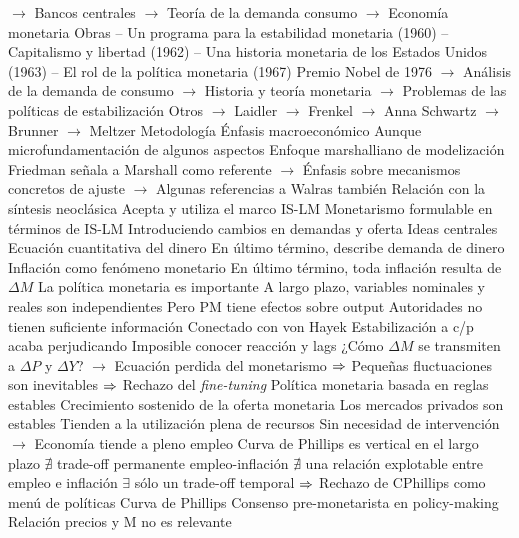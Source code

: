 \documentclass{nuevotema}
\begin{document}
\begin{esquemal}
				\4[] $\to$ Bancos centrales
				\4[] $\to$ Teoría de la demanda consumo
				\4[] $\to$ Economía monetaria
				\4[] Obras
				\4[] -- Un programa para la estabilidad monetaria (1960)
				\4[] -- Capitalismo y libertad (1962)
				\4[] -- Una historia monetaria de los Estados Unidos (1963)
				\4[] -- El rol de la política monetaria (1967)
				\4[] Premio Nobel de 1976
				\4[] $\to$ Análisis de la demanda de consumo
				\4[] $\to$ Historia y teoría monetaria
				\4[] $\to$ Problemas de las políticas de estabilización
				\4[] Otros
				\4[] $\to$ Laidler
				\4[] $\to$ Frenkel
				\4[] $\to$ Anna Schwartz
				\4[] $\to$ Brunner
				\4[] $\to$ Meltzer
			\3 Metodología
				\4 Énfasis macroeconómico
				\4[] Aunque microfundamentación de algunos aspectos
				\4 Enfoque marshalliano de modelización
				\4[] Friedman señala a Marshall como referente
				\4[] $\to$ Énfasis sobre mecanismos concretos de ajuste
				\4[] $\to$ Algunas referencias a Walras también
				\4 Relación con la síntesis neoclásica
				\4[] Acepta y utiliza el marco IS-LM
				\4[] Monetarismo formulable en términos de IS-LM
				\4[] Introduciendo cambios en demandas y oferta
			\3 Ideas centrales
				\4 Ecuación cuantitativa del dinero
				\4[] En último término, describe demanda de dinero
				\4 Inflación como fenómeno monetario
				\4[] En último término, toda inflación resulta de $\Delta M$
				\4 La política monetaria es importante
				\4[] A largo plazo, variables nominales y reales son independientes
				\4[] Pero PM tiene efectos sobre output
				\4 Autoridades no tienen suficiente información
				\4[] Conectado con von Hayek
				\4[] Estabilización a c/p acaba perjudicando
				\4[] Imposible conocer reacción y lags
				\4[] ¿Cómo $\Delta M$ se transmiten a $\Delta P$ y $\Delta Y$?
				\4[] $\to$ Ecuación perdida del monetarismo
				\4[] $\Rightarrow$ Pequeñas fluctuaciones son inevitables
				\4[] $\Rightarrow$ Rechazo del \textit{fine-tuning}
				\4 Política monetaria basada en reglas estables
				\4[] Crecimiento sostenido de la oferta monetaria
				\4 Los mercados privados son estables
				\4[] Tienden a la utilización plena de recursos
				\4[] Sin necesidad de intervención
				\4[] $\to$ Economía tiende a pleno empleo
				\4 Curva de Phillips es vertical en el largo plazo
				\4[] $\nexists$ trade-off permanente empleo-inflación
				\4[] $\nexists$ una relación explotable entre empleo e inflación
				\4[] $\exists$ sólo un trade-off temporal
				\4[] $\Rightarrow$ Rechazo de CPhillips como menú de políticas
		\2 Curva de Phillips
			\3 Consenso pre-monetarista en policy-making
				\4 Relación precios y M no es relevante

\end{esquemal}
\end{document}
